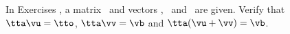 {\noin In Exercises }
{, a matrix \tta\ and vectors \vb, \vu\ and \vv\ are given. Verify that $\tta\vu=\tto$, $\tta\vv=\vb$ and $\tta(\vu+\vv)=\vb$.}
